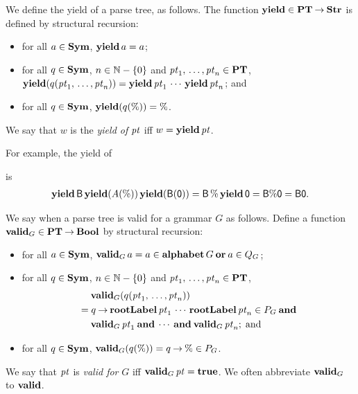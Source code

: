 We define the yield of a parse tree, as follows.  The function
$\mathbf{yield}\in\mathbf{PT}\mathbin{\to}\mathbf{Str}$ is defined by structural recursion:
\begin{itemize}
\item for all $a\in\mathbf{Sym}$, $\mathbf{yield}\,a=a$;

\item for all $q\in\mathbf{Sym}$, $n\in\mathbb{N}-\{0\}$ and
${\it pt}_1,\,\ldots,{\it pt}_n\in\mathbf{PT}$,
$\mathbf{yield}(q({\it pt}_1,\,\ldots,{\it pt}_n)) =
\mathbf{yield}\,{\it pt}_1\,\cdots\,\mathbf{yield}\,{\it pt}_n$; and

\item for all $q\in\mathbf{Sym}$, $\mathbf{yield}(q(\%))=\%$.
\end{itemize}
We say that $w$ is the \emph{yield of} ${\it pt}$ iff
$w=\mathbf{yield}\,{\it pt}$.

For example, the yield of
\begin{center}

\end{center}
is
\begin{gather*}
\mathbf{yield}\,\mathsf{B}\,\mathbf{yield}(A(\%))\,\mathbf{yield}(\mathsf{B}(\mathsf{0})) =
\mathsf{B}\,\%\,\mathbf{yield}\,\mathsf{0}=\mathsf{B}\%\mathsf{0}=\mathsf{B}\mathsf{0} .
\end{gather*}

We say when a parse tree is valid for a grammar $G$ as follows.
Define a function $\mathbf{valid}_G\in\mathbf{PT}\mathbin{\to}\mathbf{Bool}$ by
structural recursion:
\begin{itemize}
\item for all $a\in\mathbf{Sym}$, $\mathbf{valid}_G\,a=a\in
\mathbf{alphabet}\,G\mathbin{\mathbf{or}} a\in Q_G$;

\item for all $q\in\mathbf{Sym}$, $n\in\mathbb{N}-\{0\}$ and
${\it pt}_1,\,\ldots,{\it pt}_n\in\mathbf{PT}$,
\begin{align*}
&\quad\; \mathbf{valid}_G(q({\it pt}_1,\,\ldots,{\it pt}_n)) \\
&= q\mathbin{\to}\mathbf{rootLabel}\,{\it pt}_1\,\cdots\,\mathbf{rootLabel}\,{\it pt}_n\in P_G \mathbin{\mathbf{and}}{} \\
&\quad\;
\mathbf{valid}_G\,{\it pt}_1 \mathbin{\mathbf{and}}\, \cdots\, \mathbin{\mathbf{and}} \mathbf{valid}_G\,{\it pt}_n; \;\allowbreak\mbox{and}\allowbreak\;
\end{align*}

\item for all $q\in\mathbf{Sym}$, $\mathbf{valid}_G(q(\%))=q\mathbin{\to}\%\in
P_G$.
\end{itemize}
We say that ${\it pt}$ is \emph{valid for} $G$ iff $\mathbf{valid}_G\,{\it pt}=\mathbf{true}$.
We often abbreviate $\mathbf{valid}_G$ to $\mathbf{valid}$.

